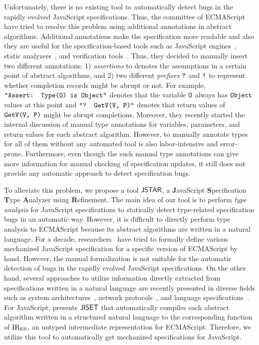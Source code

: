 Unfortunately, there is no existing tool to automatically detect bugs in the
rapidly evolved JavaScript specifications.  Thus, the committee of ECMAScript
have tried to resolve this problem using additional annotations in abstract
algorithms.  Additional annotations make the specification more readable and
also they are useful for the specification-based tools such as JavaScript
engines~\cite{v8, graaljs, qjs, moddable}, static analyzers~\cite{safe, tajs,
jsai, wala}, and verification tools~\cite{javert}.  Thus, they decided to
manually insert two different annotations: 1) \textit{assertions} to denotes the
assumptions in a certain point of abstract algorithms, and 2) two different
\textit{prefixes} $\texttt{?}$ and $\texttt{!}$ to represent whether completion
records might be abrupt or not.  For example, $\texttt{"Assert: Type(O) is
Object"}$ denotes that the variable $\texttt{O}$ always has $\texttt{Object}$ values
at this point and $\texttt{"? GetV(V, P)"}$ denotes that return values of
$\texttt{GetV(V, P)}$ might be abrupt completions.  Moreover, they recently
started the internal discussion of manual type annotations for variables,
parameters, and return values for each abstract algorithm.  However, to manually
annotate types for all of them without any automated tool is also
labor-intensive and error-prone.  Furthermore, even though the such manual type
annotations can give more information for manual checking of specification
updates, it still does not provide any automatic approach to detect
specification bugs.

To alleviate this problem, we propose a tool $\textsf{JSTAR}$, a \textbf{J}avaScript
\textbf{S}pecification \textbf{T}ype \textbf{A}nalyzer using
\textbf{R}efinement.  The main idea of our tool is to perform \textit{type
analysis} for JavaScript specifications to statically detect type-related
specification bugs in an automatic way.  However, it is difficult to directly
perform type analysis to ECMAScript because its abstract algorithms are written
in a natural language.  For a decade, researchers~\cite{lambdajs, jscert, kjs}
have tried to formally define various mechanized JavaScript specification for a
specific version of ECMAScript by hand.  However, the manual formalization is
not suitable for the automatic detection of bugs in the rapidly evolved
JavaScript specifications.  On the other hand, several approaches to utilize
information directly extracted from specifications written in a natural language
are recently presented in diverse fields such as system architectures~\cite{x86,
arm}, network protocols~\cite{basespec}, and language
specifications~\cite{spectest}.  For JavaScript, \citet{jiset} presents $\textsf{JISET}$
that automatically compiles each abstract algorithm written in a structured
natural language to the corresponding function of ${\text{IR}_\text{ES}}$, an untyped
intermediate representation for ECMAScript.  Therefore, we utilize this tool to
automatically get mechanized specifications for JavaScript.

